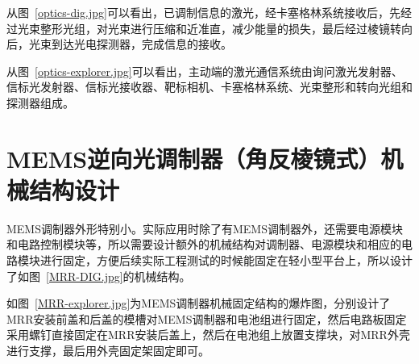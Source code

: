 
从图~\ref{optics-dig.jpg}可以看出，已调制信息的激光，经卡塞格林系统接收后，先经过光束整形光组，对光束进行压缩和近准直，减少能量的损失，最后经过棱镜转向后，光束到达光电探测器，完成信息的接收。

从图~\ref{optics-explorer.jpg}可以看出，主动端的激光通信系统由询问激光发射器、信标光发射器、信标光接收器、靶标相机、卡塞格林系统、光束整形和转向光组和探测器组成。




\section{MEMS逆向光调制器（角反棱镜式）机械结构设计}
MEMS调制器外形特别小。实际应用时除了有MEMS调制器外，还需要电源模块和电路控制模块等，所以需要设计额外的机械结构对调制器、电源模块和相应的电路模块进行固定，方便后续实际工程测试的时候能固定在轻小型平台上，所以设计了如图~\ref{MRR-DIG.jpg}的机械结构。





如图~\ref{MRR-explorer.jpg}为MEMS调制器机械固定结构的爆炸图，分别设计了MRR安装前盖和后盖的模槽对MEMS调制器和电池组进行固定，然后电路板固定采用螺钉直接固定在MRR安装后盖上，然后在电池组上放置支撑块，对MRR外壳进行支撑，最后用外壳固定架固定即可。




